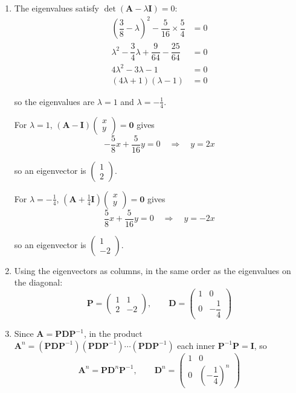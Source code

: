 \documentclass[leqno]{article}
\begin{document}
\begin{enumerate}[
  label=\textbf{\arabic*.},
  leftmargin=*,
  topsep=0pt,
  partopsep=0pt,
  parsep=0pt
]
\vspace*{10pt}

\begin{djsSolution}
\begin{enumerate}[label=\textbf{(\alph*)}, start=1]
  \item The eigenvalues satisfy \(\det(\mathbf{A}-\lambda\mathbf{I})=0\):
\begin{align*}
\left(\dfrac{3}{8}-\lambda\right)^2-\dfrac{5}{16}\times\dfrac{5}{4}&=0\\
\lambda^2-\dfrac{3}{4}\lambda+\dfrac{9}{64}-\dfrac{25}{64}&=0\\
4\lambda^2-3\lambda-1&=0\\
(4\lambda+1)(\lambda-1)&=0
\end{align*}

so the eigenvalues are \(\lambda=1\) and \(\lambda=-\frac{1}{4}\).

For \(\lambda=1\), \((\mathbf{A}-\mathbf{I})\begin{pmatrix}x\\y\end{pmatrix}=\mathbf{0}\) gives
\[
-\dfrac{5}{8}x+\dfrac{5}{16}y=0\quad\Longrightarrow\quad y=2x
\]

so an eigenvector is \(\begin{pmatrix}1\\2\end{pmatrix}\).

For \(\lambda=-\frac{1}{4}\), \(\left(\mathbf{A}+\frac14\mathbf{I}\right)\begin{pmatrix}x\\y\end{pmatrix}=\mathbf{0}\) gives
\[
\dfrac{5}{8}x+\dfrac{5}{16}y=0\quad\Longrightarrow\quad y=-2x
\]

so an eigenvector is \(\begin{pmatrix}1\\-2\end{pmatrix}\).

  \item Using the eigenvectors as columns, in the same order as the eigenvalues on the diagonal:
\[
\mathbf{P}=\begin{pmatrix}1&1\\2&-2\end{pmatrix},\qquad \mathbf{D}=\begin{pmatrix}1&0\\0&-\dfrac{1}{4}\end{pmatrix}
\]

  \item Since \(\mathbf{A}=\mathbf{P}\mathbf{D}\mathbf{P}^{-1}\), in the product \(\mathbf{A}^n=(\mathbf{P}\mathbf{D}\mathbf{P}^{-1})(\mathbf{P}\mathbf{D}\mathbf{P}^{-1})\cdots(\mathbf{P}\mathbf{D}\mathbf{P}^{-1})\) each inner \(\mathbf{P}^{-1}\mathbf{P}=\mathbf{I}\), so
\[
\mathbf{A}^n=\mathbf{P}\mathbf{D}^n\mathbf{P}^{-1},\qquad \mathbf{D}^n=\begin{pmatrix}1&0\\0&\left(-\dfrac{1}{4}\right)^n\end{pmatrix}
\]


\end{enumerate}
\end{djsSolution}
\end{enumerate}
\end{document}
